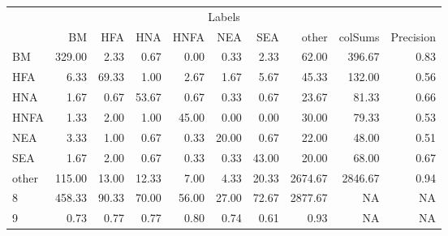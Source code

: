 \begin{table}
\centering\begingroup\fontsize{11}{13}\selectfont

\begin{tabular}{lrrrrrr>{}r|rr}
\toprule
\multicolumn{10}{c}{Labels} \\
\cmidrule(l{3pt}r{3pt}){1-10}
  & BM & HFA & HNA & HNFA & NEA & SEA & other & colSums & Precision\\
\midrule
BM & 329.00 & 2.33 & 0.67 & 0.00 & 0.33 & 2.33 & 62.00 & 396.67 & 0.83\\
HFA & 6.33 & 69.33 & 1.00 & 2.67 & 1.67 & 5.67 & 45.33 & 132.00 & 0.56\\
HNA & 1.67 & 0.67 & 53.67 & 0.67 & 0.33 & 0.67 & 23.67 & 81.33 & 0.66\\
HNFA & 1.33 & 2.00 & 1.00 & 45.00 & 0.00 & 0.00 & 30.00 & 79.33 & 0.53\\
NEA & 3.33 & 1.00 & 0.67 & 0.33 & 20.00 & 0.67 & 22.00 & 48.00 & 0.51\\
\addlinespace
SEA & 1.67 & 2.00 & 0.67 & 0.33 & 0.33 & 43.00 & 20.00 & 68.00 & 0.67\\
other & 115.00 & 13.00 & 12.33 & 7.00 & 4.33 & 20.33 & 2674.67 & 2846.67 & 0.94\\
8 & 458.33 & 90.33 & 70.00 & 56.00 & 27.00 & 72.67 & 2877.67 & NA & NA\\
9 & 0.73 & 0.77 & 0.77 & 0.80 & 0.74 & 0.61 & 0.93 & NA & NA\\
\bottomrule
\end{tabular}
\endgroup{}
\end{table}
